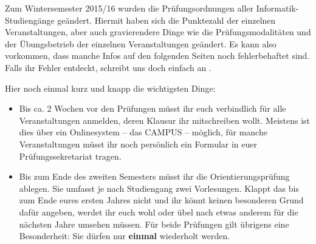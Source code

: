 
Zum Wintersemester 2015/16 wurden die Pr\"ufungsordnungen aller Informatik-Studieng\"ange geändert.
Hiermit haben sich die Punktezahl der einzelnen Veranstaltungen, aber auch gravierendere Dinge wie die
Prüfungsmodalitäten und der Übungsbetrieb der einzelnen Veranstaltungen geändert. 
Es kann also vorkommen, dass manche Infos auf den folgenden Seiten noch fehlerbehaftet sind.
Falls ihr Fehler entdeckt, schreibt uns doch einfach an .

Hier noch einmal kurz und knapp die wichtigsten Dinge:

\begin{itemize}
\item Bis ca. 2 Wochen vor den Prüfungen müsst ihr euch verbindlich für alle Veranstaltungen anmelden,
  deren Klausur ihr mitschreiben wollt. %
  Meistens ist dies über ein Onlinesystem -- das CAMPUS -- möglich, für manche Veranstaltungen müsst ihr noch persönlich
  ein Formular in euer Prüfungssekretariat tragen.


\item Bis zum Ende des zweiten Semesters müsst ihr die Orientierungsprüfung ablegen. Sie umfasst je nach Studiengang zwei Vorlesungen.
  Klappt das bis zum Ende eures ersten Jahres nicht und ihr
  könnt keinen besonderen Grund dafür angeben, werdet ihr euch wohl oder übel nach
  etwas anderem für die nächsten Jahre umsehen müssen. Für beide Prüfungen gilt übrigens eine Besonderheit:
  Sie dürfen nur \textbf{einmal} wiederholt werden.
 

\end{itemize}

